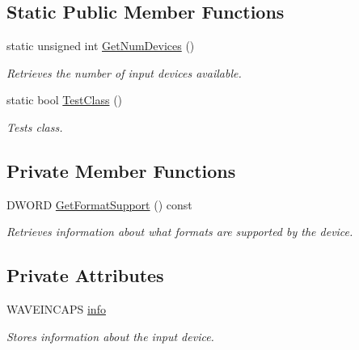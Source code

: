 \subsection*{Static Public Member Functions}
\begin{DoxyCompactItemize}
\item 
static unsigned int \hyperlink{class_sound_device_input_a7dfe263a3f83af8f7b75c7247bf58974}{GetNumDevices} ()
\begin{DoxyCompactList}\small\item\em Retrieves the number of input devices available. \item\end{DoxyCompactList}\item 
static bool \hyperlink{class_sound_device_input_afc87d7fa5285552c904cff4bea4e9892}{TestClass} ()
\begin{DoxyCompactList}\small\item\em Tests class. \item\end{DoxyCompactList}\end{DoxyCompactItemize}
\subsection*{Private Member Functions}
\begin{DoxyCompactItemize}
\item 
DWORD \hyperlink{class_sound_device_input_a14d0fb3bd7428b7d2baaf20311f9ee82}{GetFormatSupport} () const 
\begin{DoxyCompactList}\small\item\em Retrieves information about what formats are supported by the device. \item\end{DoxyCompactList}\end{DoxyCompactItemize}
\subsection*{Private Attributes}
\begin{DoxyCompactItemize}
\item 
\hypertarget{class_sound_device_input_a77a87d0357d50ce97d94e9eb4c28bcbb}{
WAVEINCAPS \hyperlink{class_sound_device_input_a77a87d0357d50ce97d94e9eb4c28bcbb}{info}}
\label{class_sound_device_input_a77a87d0357d50ce97d94e9eb4c28bcbb}

\begin{DoxyCompactList}\small\item\em Stores information about the input device. \item\end{DoxyCompactList}\end{DoxyCompactItemize}


